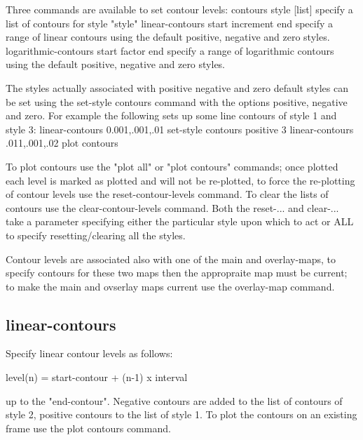 Three commands are available to set contour levels:
   contours style [list]                   specify a list of contours
                                           for style "style"
   linear-contours start increment end     specify a range of linear contours
                                           using the default positive,
                                           negative and zero styles.
   logarithmic-contours start factor end   specify a range of logarithmic
                                           contours using the default positive,
                                           negative and zero styles.

The styles actually associated with positive negative and zero default
styles can be set using the set-style contours command with the options
positive, negative and zero.  For example the following sets up some
line contours of style 1 and style 3:
   linear-contours 0.001,.001,.01
   set-style contours positive 3
   linear-contours .011,.001,.02
   plot contours

To plot contours use the "plot all" or "plot contours" commands; once
plotted each level is marked as plotted and will not be re-plotted, to force
the re-plotting of contour levels use the reset-contour-levels command.  To
clear the lists of contours use the clear-contour-levels command.  Both
the reset-... and clear-... take a parameter specifying either the particular
style upon which to act or ALL to specify resetting/clearing all the styles.

Contour levels are associated also with one of the main and overlay-maps, to
specify contours for these two maps then the appropraite map must be current;
to make the main and ovserlay maps current use the overlay-map command.


\subsection{linear-contours}


Specify linear contour levels as follows:


          level(n) = start-contour + (n-1) x interval


up to the "end-contour". Negative contours are added to the
list of contours of style 2, positive contours to the list of
style 1. To plot the contours on an existing frame use the
plot contours command.

